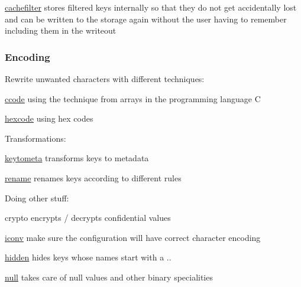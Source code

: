 \begin{DoxyItemize}
\item \hyperlink{md_src_plugins_cachefilter_README_src_plugins_cachefilter_README_md}{cachefilter} stores filtered keys internally so that they do not get accidentally lost and can be written to the storage again without the user having to remember including them in the writeout
\end{DoxyItemize}

\subsubsection*{Encoding}

Rewrite unwanted characters with different techniques\+:


\begin{DoxyItemize}
\item \hyperlink{md_src_plugins_ccode_README_src_plugins_ccode_README_md}{ccode} using the technique from arrays in the programming language C
\item \hyperlink{md_src_plugins_hexcode_README_src_plugins_hexcode_README_md}{hexcode} using hex codes
\end{DoxyItemize}

Transformations\+:


\begin{DoxyItemize}
\item \hyperlink{md_src_plugins_keytometa_README_src_plugins_keytometa_README_md}{keytometa} transforms keys to metadata
\item \hyperlink{md_src_plugins_rename_README_src_plugins_rename_README_md}{rename} renames keys according to different rules
\end{DoxyItemize}

Doing other stuff\+:


\begin{DoxyItemize}
\item crypto encrypts / decrypts confidential values
\item \hyperlink{md_src_plugins_iconv_README_src_plugins_iconv_README_md}{iconv} make sure the configuration will have correct character encoding
\item \hyperlink{md_src_plugins_hidden_README_src_plugins_hidden_README_md}{hidden} hides keys whose names start with a {\ttfamily .}.
\item \hyperlink{md_src_plugins_null_README_src_plugins_null_README_md}{null} takes care of null values and other binary specialities
\end{DoxyItemize}

